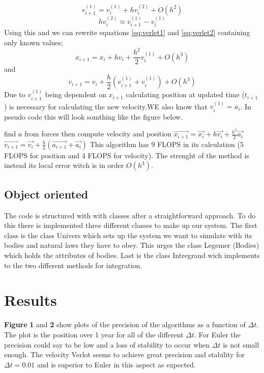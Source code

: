 \documentclass[twoside,twocolumn]{article}
\begin{document}
\[
v_{i+1}^{(1)} =v_{i}^{(1)}+ h v_{i}^{(2)} + O(h^2)
\] 
\[
hv_{i}^{(2)} \approx v_{i+1}^{(1)}-  v_{i}^{(1)}
\] 
Using this and we can rewrite equations \ref{eq:verlet1} and \ref{eq:verlet2} containing only known values;
\begin{equation}
x_{i+1} =x_{i}+ h v_{i} +\frac{h^2}{2} v_{i}^{(1)} + O(h^3)
\end{equation}
and
\begin{equation}
v_{i+1} =v_{i}+ \frac{h}{2} \left( v_{i+1}^{(1)}+v_{i}^{(1)} \right)+ O(h^3)
\end{equation}
Due to $v_{i+1}^{(1)}$ being dependent on $x_{i+1}$ calculating position at updated time ($t_{i+1}$) is necessary for calculating the new velocity.WE also know that $v_{i}^{(1)} = a_i $. In pseudo code this will look somthing like the figure below.
\begin{algorithmic}[H]
\State find $a$ from forces
\State then compute velocity and position
\State $\vec{  x_{i+1}} = \vec{x_{i}} + h \vec{v_i}+\frac{h^2}{2}\vec{a_i}$
\State $\vec{  v_{i+1}} = \vec{v_{i}} + \frac{h}{2} (\vec{a_{i+1}}+\vec{a_i})$
\EndFor
This algorithm has 9 FLOPS in its calculation (5 FLOPS for position and 4 FLOPS for velocity). The strenght of the method is instead its local error witch is in order $O(h^3)$.
\end{algorithmic}

\subsection{Object oriented}
The code is structured with with classes after a straightforward approach. To do this there is implemented three different classes to make up our system. The first class is the class Univers which sets up the system we want to simulate with its bodies and natural laws they have to obey. This urges the class Legemer (Bodies) which holds the attributes of bodies. Last is the class Intregrand wich implements to the two different methods for integration.


\section{Results}
\textbf{Figure} \textbf{1} and \textbf{2} show plots of the precision of the algorithms as a function of $\Delta t$. The plot is the position over 1 year for all of the different $\Delta t$. For Euler the precision could say to be low and a loss of stability to occur when $\Delta t$ is not small enough. The velocity Verlot seems to achieve great precision and stability for $\Delta t = 0.01$ and is superior to Euler in this aspect as expected.
 
\end{document}
